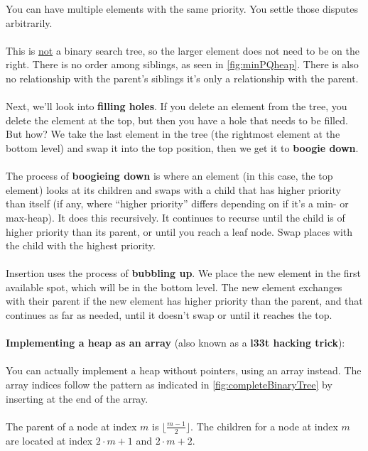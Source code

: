 \documentclass[]{article}
\theoremstyle{definition}
\begin{document}
\begin{enumerate}
						You can have multiple elements with the same priority. You settle those disputes arbitrarily.
						\\ \\
						This is \underline{not} a binary search tree, so the larger element does not need to be on the right. There is no order among siblings, as seen in \ref{fig:minPQheap}. There is also no relationship with the parent's siblings \textendash{} it's only a relationship with the parent.
						\\ \\
						Next, we'll look into \textbf{filling holes}. If you delete an element from the tree, you delete the element at the top, but then you have a hole that needs to be filled. But how? We take the last element in the tree (the rightmost element at the bottom level) and swap it into the top position, then we get it to \textbf{boogie down}.
						\\ \\
						The process of \textbf{boogieing down} is where an element (in this case, the top element) looks at its children and swaps with a child that has higher priority than itself (if any, where ``higher priority'' differs depending on if it's a min- or max-heap). It does this recursively. It continues to recurse until the child is of higher priority than its parent, or until you reach a leaf node. Swap places with the child with the highest priority.
						\\ \\
						Insertion uses the process of \textbf{bubbling up}. We place the new element in the first available spot, which will be in the bottom level. The new element exchanges with their parent if the new element has higher priority than the parent, and that continues as far as needed, until it doesn't swap or until it reaches the top.
						\\ \\
						\textbf{Implementing a heap as an array} (also known as a \textbf{l33t hacking trick}):
						\\ \\ 
						You can actually implement a heap without pointers, using an array instead. The array indices follow the pattern as indicated in \ref{fig:completeBinaryTree} by inserting at the end of the array.
						\\ \\
						The parent of a node at index $m$ is $\lfloor \frac{m - 1}{2} \rfloor$. The children for a node at index $m$ are located at index $2 \cdot m + 1$ and $2 \cdot m + 2$.

\end{enumerate}
\end{document}

